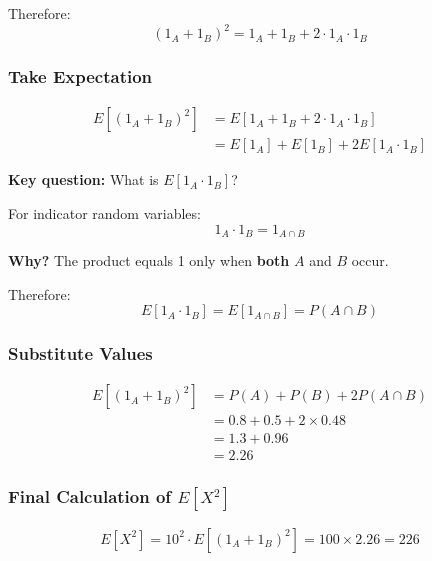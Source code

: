 \documentclass[11pt]{article}
\begin{document}
Therefore:
\begin{equation}
(1_A + 1_B)^2 = 1_A + 1_B + 2 \cdot 1_A \cdot 1_B
\end{equation}

\subsubsection{Take Expectation}

\begin{align}
E[(1_A + 1_B)^2] &= E[1_A + 1_B + 2 \cdot 1_A \cdot 1_B]\\
&= E[1_A] + E[1_B] + 2E[1_A \cdot 1_B]
\end{align}

\textbf{Key question:} What is $E[1_A \cdot 1_B]$?

\begin{tcolorbox}[colback=green!5!white,colframe=green!75!black,title=Product of Indicators]
For indicator random variables:
\begin{equation}
1_A \cdot 1_B = 1_{A \cap B}
\end{equation}

\textbf{Why?} The product equals 1 only when \textbf{both} $A$ and $B$ occur.

Therefore:
\begin{equation}
E[1_A \cdot 1_B] = E[1_{A \cap B}] = P(A \cap B)
\end{equation}
\end{tcolorbox}

\subsubsection{Substitute Values}

\begin{align}
E[(1_A + 1_B)^2] &= P(A) + P(B) + 2P(A \cap B)\\
&= 0.8 + 0.5 + 2 \times 0.48\\
&= 1.3 + 0.96\\
&= 2.26
\end{align}

\subsubsection{Final Calculation of $E[X^2]$}

\begin{equation}
E[X^2] = 10^2 \cdot E[(1_A + 1_B)^2] = 100 \times 2.26 = 226
\end{equation}
\end{document}
